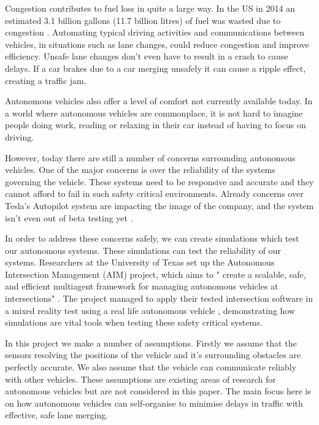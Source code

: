 Congestion contributes to fuel loss in quite a large way. In the US in 2014 an estimated 3.1 billion gallons (11.7 billion litres) of fuel was wasted due to congestion \citep{Schrank2015}. Automating typical driving activities and communications between vehicles, in situations such as lane changes, could reduce congestion and improve efficiency. Unsafe lane changes don't even have to result in a crash to cause delays. If a car brakes due to a car merging unsafely it can cause a ripple effect, creating a traffic jam.

Autonomous vehicles also offer a level of comfort not currently available today. In a world where autonomous vehicles are commonplace, it is not hard to imagine people doing work, reading or relaxing in their car instead of having to focus on driving. 

However, today there are still a number of concerns surrounding autonomous vehicles. One of the major concerns is over the reliability of the systems governing the vehicle. These systems need to be responsive and accurate and they cannot afford to fail in such safety critical environments. Already concerns over Tesla's Autopilot system are impacting the image of the company, and the system isn't even out of beta testing yet \citep{TeslaCriticised}. 

In order to address these concerns safely, we can create simulations which test our autonomous systems. These simulations can test the reliability of our systems. Researchers at the University of Texas set up the Autonomous Intersection Management (AIM) project, which aims to " create a scalable, safe, and efficient multiagent framework for managing autonomous vehicles at intersections" \citep{AIMProject}. The project managed to apply their tested intersection software in a mixed reality test using a real life autonomous vehicle \citep{Quinlan2010}, demonstrating how simulations are vital tools when testing these safety critical systems.

In this project we make a number of assumptions. Firstly we assume that the sensors resolving the positions of the vehicle and it's surrounding obstacles are perfectly accurate. We also assume that the vehicle can communicate reliably with other vehicles. These assumptions are existing areas of research for autonomous vehicles but are not considered in this paper. The main focus here is on how autonomous vehicles can self-organise to minimise delays in traffic with effective, safe lane merging.

